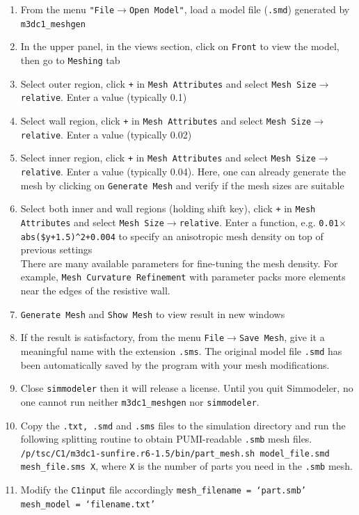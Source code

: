 \begin{enumerate}
\item From the menu \texttt{"File$\rightarrow$Open Model"}, load a model file (\texttt{.smd}) generated by \texttt{m3dc1\_meshgen}
\item In the upper panel, in the views section, click on \texttt{Front} to view the model, then go to \texttt{Meshing} tab
\item Select outer region, click \texttt{+} in \texttt{Mesh Attributes} and select \texttt{Mesh Size$\rightarrow$relative}. 
Enter a value (typically 0.1)
\item Select wall region, click \texttt{+} in \texttt{Mesh Attributes} and select \texttt{Mesh Size$\rightarrow$relative}. 
Enter a value (typically 0.02)
\item Select inner region, click \texttt{+} in \texttt{Mesh Attributes} and select \texttt{Mesh Size$\rightarrow$relative}. 
Enter a value (typically 0.04). Here, one can already generate the mesh by clicking on \texttt{Generate Mesh} and verify if the mesh sizes are suitable 
\item 	Select both inner and wall regions (holding shift key), click \texttt{+} in \texttt{Mesh Attributes} and select \texttt{Mesh Size$\rightarrow$relative}. Enter a function, e.g. \texttt{0.01$\times$abs(\$y+1.5)\^{}2+0.004} to specify an anisotropic mesh density on top of previous settings
\\ There are many available parameters for fine-tuning the mesh density.  For example, \texttt{Mesh Curvature Refinement} with parameter packs more elements near the edges of the resistive wall. 
\item \texttt{Generate Mesh} and \texttt{Show Mesh} to view result in new windows
\item If the result is satisfactory, from the menu \texttt{File$\rightarrow$Save Mesh}, give it a meaningful name with the extension \texttt{.sms}. The original model file \texttt{.smd} has been automatically saved by the program with your mesh modifications.
\item Close \texttt{simmodeler} then it will release a license. Until you quit Simmodeler, no one cannot run neither \texttt{m3dc1\_meshgen} nor \texttt{simmodeler}.
\item Copy the \texttt{.txt, .smd} and \texttt{.sms} files to the simulation directory and run the following splitting routine to obtain PUMI-readable \texttt{.smb} mesh files.
\newline\newline
\texttt{/p/tsc/C1/m3dc1-sunfire.r6-1.5/bin/part\_mesh.sh model\_file.smd mesh\_file.sms X}, 
where \texttt{X} is the number of parts you need in the \texttt{.smb} mesh.
\item Modify the \texttt{C1input} file accordingly
\newline\newline
\texttt{mesh\_filename = `part.smb'
\\
mesh\_model = `filename.txt'
}
\end{enumerate}

